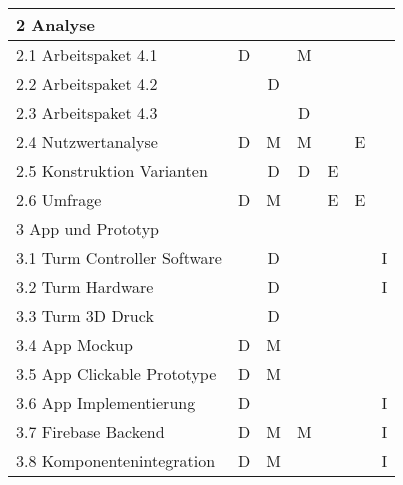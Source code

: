 \begin{longtable}{|l|c|c|c|c|c|c|}
  \multicolumn{7}{|l|}{2 Analyse}                                                                                               \\ \hline
  2.1 Arbeitspaket 4.1                   & D              &             & M          &          &               &               \\ \hline
  2.2 Arbeitspaket 4.2                   &                & D           &            &          &               &               \\ \hline
  2.3 Arbeitspaket 4.3                   &                &             & D          &          &               &               \\ \hline
  2.4 Nutzwertanalyse                    & D              & M           & M          &          & E             &               \\ \hline
  2.5 Konstruktion Varianten             &                & D           & D          & E        &               &               \\ \hline
  2.6 Umfrage                            & D              & M           &            & E        & E             &               \\ \hline

  \multicolumn{7}{|l|}{3 App und Prototyp }                                                                                     \\ \hline
  3.1 Turm Controller Software           &                & D           &            &          &               & I             \\ \hline
  3.2 Turm Hardware                      &                & D           &            &          &               & I             \\ \hline
  3.3 Turm 3D Druck                      &                & D           &            &          &               &               \\ \hline
  3.4 App Mockup                         & D              & M           &            &          &               &               \\ \hline
  3.5 App Clickable Prototype            & D              & M           &            &          &               &               \\ \hline
  3.6 App Implementierung                & D              &             &            &          &               & I             \\ \hline
  3.7 Firebase Backend                   & D              & M           & M          &          &               & I             \\ \hline
  3.8 Komponentenintegration             & D              & M           &            &          &               & I             \\ \hline


\end{longtable}

